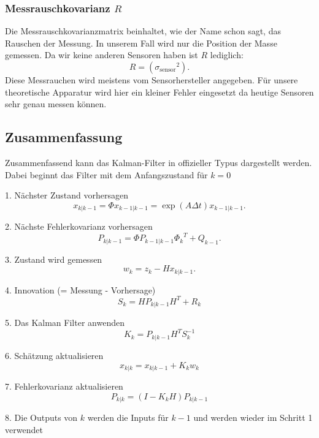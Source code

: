 \subsubsection*{Messrauschkovarianz $R$}
Die Messrauschkovarianzmatrix beinhaltet, wie der Name schon sagt, das Rauschen der Messung. 
In unserem Fall wird nur die Position der Masse gemessen. Da wir keine anderen Sensoren haben ist $R$ lediglich:
\[ 
R= ({\sigma_\mathrm{sensor}}^2).
 \] 
Diese Messrauchen wird meistens vom Sensorhersteller angegeben. 
Für unsere theoretische Apparatur wird hier ein kleiner Fehler eingesetzt da heutige Sensoren sehr genau messen können. 

\subsection{Zusammenfassung }
Zusammenfassend kann das Kalman-Filter in offizieller Typus dargestellt werden. 
Dabei beginnt das Filter mit dem Anfangszustand für $k=0$

1. Nächster Zustand vorhersagen
\[
{x_{k|k-1}}=\Phi{x_{k-1|k-1}}= \exp(A\Delta t){x_{k-1|k-1}}.
\] 

2. Nächste Fehlerkovarianz vorhersagen
\[
{P_{k|k-1}}=\Phi {P_{k-1|k-1}} {\Phi _{k}}^T + {Q_{k-1}}.
\] 

3. Zustand wird gemessen
\[
{w_{k}}={z_{k}}-{H}{x_{k|k-1}}.
\] 

4. Innovation (= Messung -  Vorhersage)
\[ 
{S_{k}}={H}{P_{k|k-1}}{H}^T+{R_{k}}
\] 

5. Das Kalman Filter anwenden
\[
{K_{k}}= {P_{k|k-1}} {H^T}{S_{k}^{-1}}
\] 

6. Schätzung aktualisieren
\[
{x_{k|k}}={x_{k|k-1}}+{K_{k}}{w_{k}}
\] 

7. Fehlerkovarianz aktualisieren
\[
{P_{k|k}}=(I-{K_{k}}{H}){P_{k|k-1}}
\] 

8. Die Outputs von $k$ werden die Inputs für ${k-1}$ und werden wieder im Schritt 1 verwendet

